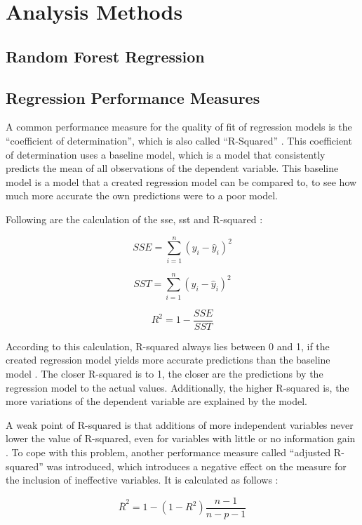 \documentclass[a4paper, 11pt, oneside]{Thesis}  %
\begin{document}
 
 \chapter{Analysis Methods}

\section{Random Forest Regression}

\section{Regression Performance Measures}

A common performance measure for the quality of fit of regression models is the ``coefficient of determination'', which is also called ``R-Squared'' \cite{Devasthali.2018}. This coefficient of determination uses a baseline model, which is a model that consistently predicts the mean of all observations of the dependent variable. This baseline model is a model that a created regression model can be compared to, to see how much more accurate the own predictions were to a poor model.

Following are the calculation of the \ac{sse}, \ac{sst} and R-squared \cite{Devasthali.2018}:

\[SSE = \sum\limits_{i=1}^n (y_{i} - \hat{y}_{i})^2\]

\[SST = \sum\limits_{i=1}^n (y_{i} - \hat{y}_{i})^2\]

\[ R^2 = 1 - \frac{SSE}{SST}\]

According to this calculation, R-squared always lies between 0 and 1, if the created regression model yields more accurate predictions than the baseline model \cite{Devasthali.2018}. The closer R-squared is to 1, the closer are the predictions by the regression model to the actual values. Additionally, the higher R-squared is, the more variations of the dependent variable are explained by the model.

A weak point of R-squared is that additions of more independent variables never lower the value of R-squared, even for variables with little or no information gain \cite{Devasthali.2018}. To cope with this problem, another performance measure called ``adjusted R-squared'' was introduced, which introduces a negative effect on the measure for the inclusion of ineffective variables. It is calculated as follows \cite{Devasthali.2018}:

\[ \bar{R}^2 = 1 - (1-R^2)\frac{n-1}{n-p-1}\]
\end{document}
